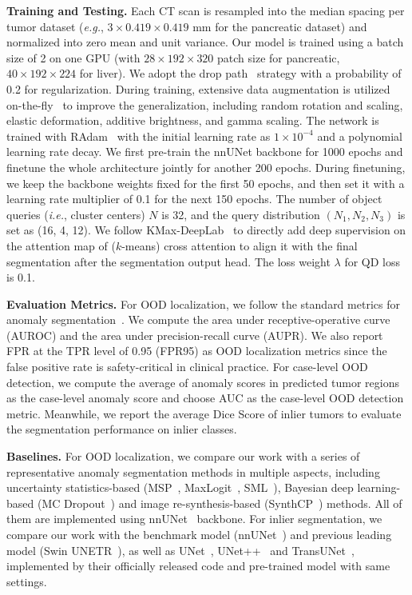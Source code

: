 \documentclass[10pt,twocolumn,letterpaper]{article}
\begin{document}
{\bf Training and Testing.} Each CT scan is resampled into the median spacing per tumor dataset (\textit{e.g.}, $3 \times 0.419 \times 0.419$ mm for the pancreatic dataset) and  normalized into zero mean and unit variance. Our model is trained using a batch size of 2 on one GPU (with $28 \times 192 \times 320$ patch size for pancreatic, $40 \times 192 \times 224$ for liver). We adopt the drop path~\cite{huang2016deep} strategy with a probability of 0.2 for regularization. During training, extensive data augmentation is utilized on-the-fly~\cite{isensee2021nnu} to improve the generalization, including random rotation and scaling, elastic deformation, additive brightness, and gamma scaling. The network is trained with RAdam~\cite{liu2019variance} with the initial learning rate as $1 \times 10^{-4}$ and a polynomial learning rate decay. We first pre-train the nnUNet backbone for 1000 epochs and finetune the whole architecture jointly for another 200 epochs. During finetuning, we keep the backbone weights fixed for the first 50 epochs, and then set it with a learning rate multiplier of 0.1 for the next 150 epochs. The number of object queries (\textit{i.e.}, cluster centers) $N$ is 32, and the query distribution $(N_1, N_2, N_3)$ is set as (16, 4, 12). We follow KMax-DeepLab~\cite{yu2022k} to directly add deep supervision on the attention map of ($k$-means) cross attention to align it with the final segmentation after the segmentation output head. The loss weight $\lambda$ for QD loss is 0.1. 

{\bf Evaluation Metrics.} For OOD localization, we follow the standard metrics for anomaly segmentation~\cite{xia2020synthesize,jung2021standardized,raml2022}. We compute the area under receptive-operative curve (AUROC) and the area under precision-recall curve (AUPR). We also report FPR at the TPR level of 0.95 (FPR95) as OOD localization metrics since the false positive rate is safety-critical in clinical practice. For case-level OOD detection, we compute the average of anomaly scores in predicted tumor regions as the case-level anomaly score and choose AUC as the case-level OOD detection metric. Meanwhile, we report the average Dice Score of inlier tumors to evaluate the segmentation performance on inlier classes.

{\bf Baselines.} For OOD localization, we compare our work with a series of representative anomaly segmentation methods in multiple aspects, including uncertainty statistics-based (MSP~\cite{hendrycks2016baseline}, MaxLogit~\cite{hendrycks2019scaling}, SML~\cite{jung2021standardized}), Bayesian deep learning-based (MC Dropout~\cite{kendall2017uncertainties}) and image re-synthesis-based (SynthCP~\cite{xia2020synthesize}) methods. All of them are implemented using nnUNet~\cite{isensee2021nnu} backbone. For inlier segmentation, we compare our work with the benchmark model (nnUNet~\cite{isensee2021nnu}) and previous leading model (Swin UNETR~\cite{tang2022self_swinunetr}), as well as UNet~\cite{ronneberger2015u_unet0}, UNet++~\cite{zhou2019unet++_unet7} and TransUNet~\cite{chen2021transunet}, implemented by their officially released code and pre-trained model with same settings.
\end{document}
